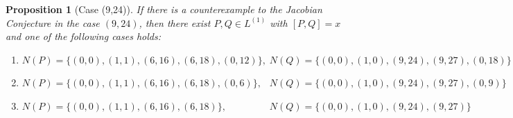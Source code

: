 \documentclass[reqno,a4paper,twoside]{amsart}
\newtheorem{proposition}[theorem]{Proposition}
\theoremstyle{definition}
\theoremstyle{remark}
\begin{document}
\begin{proposition}[Case (9,24)] \label{case924}
	If there is a counterexample to the Jacobian Conjecture in the case $(9,24)$, then there exist $P,Q \in L^{(1)}$ with $[P,Q] = x$ and one of the following cases holds:
	\begin{enumerate}
	\item
	$N(P) = \{(0,0),(1,1),(6,16), (6,18), (0,12)\} , \;
	N(Q) = \{(0,0),(1,0),(9,24), (9,27), (0,18)\}$
	\item  	$N(P) = \{(0,0),(1,1),(6,16), (6,18), (0,6)\},\phantom{2} \;
	N(Q) = \{(0,0),(1,0),(9,24), (9,27), (0,9)\}$
	\item $	N(P) = \{(0,0),(1,1),(6,16), (6,18)\},\phantom{, (0,12)} \;
	N(Q) = \{(0,0),(1,0),(9,24), (9,27)\}$
	\end{enumerate}

\end{proposition}
\end{document}
